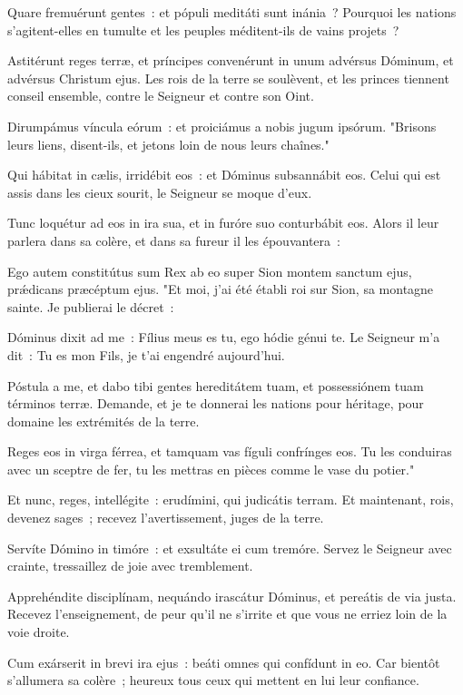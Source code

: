 \begin{paracol}{2}

\LigneParacol{0cm}
{Quare fremuérunt gentes~: \GreStar{} et pópuli meditáti sunt inánia~?}
{Pourquoi les nations s'agitent-elles en tumulte et les peuples méditent-ils de vains projets~? }

\LigneParacol{0.2cm}
{Astitérunt reges terræ, et príncipes convenérunt in unum \GreStar{} advérsus Dóminum, et advérsus Christum ejus.}
{Les rois de la terre se soulèvent, et les princes tiennent conseil ensemble, contre le Seigneur et contre son Oint. }

\LigneParacol{0.2cm}
{Dirumpámus víncula eórum~: \GreStar{} et proiciámus a nobis jugum ipsórum.}
{"Brisons leurs liens, disent-ils, et jetons loin de nous leurs chaînes." }

\LigneParacol{0.2cm}
{Qui hábitat in cælis, irridébit eos~: \GreStar{} et Dóminus subsannábit eos.}
{Celui qui est assis dans les cieux sourit, le Seigneur se moque d'eux. }

\LigneParacol{0.2cm}
{Tunc loquétur ad eos in ira sua, \GreStar{} et in furóre suo conturbábit eos.}
{Alors il leur parlera dans sa colère, et dans sa fureur il les épouvantera~: }

\LigneParacol{0.2cm}
{Ego autem constitútus sum Rex ab eo super Sion montem sanctum ejus, \GreStar{} prǽdicans præcéptum ejus.}
{"Et moi, j'ai été établi roi sur Sion, sa montagne sainte. Je publierai le décret~:}

\LigneParacol{0.2cm}
{Dóminus dixit ad me~: \GreStar{} Fílius meus es tu, ego hódie génui te.}
{Le Seigneur m'a dit~: Tu es mon Fils, je t'ai engendré aujourd'hui. }

\LigneParacol{0.2cm}
{Póstula a me, et dabo tibi gentes hereditátem tuam, \GreStar{} et possessiónem tuam términos terræ.}
{Demande, et je te donnerai les nations pour héritage, pour domaine les extrémités de la terre. }

\LigneParacol{0.2cm}
{Reges eos in virga férrea, \GreStar{} et tamquam vas fíguli confrínges eos.}
{Tu les conduiras avec un sceptre de fer, tu les mettras en pièces comme le vase du potier." }

\LigneParacol{0.2cm}
{Et nunc, reges, intellégite~: \GreStar{} erudímini, qui judicátis terram.}
{Et maintenant, rois, devenez sages~; recevez l'avertissement, juges de la terre. }

\LigneParacol{0.2cm}
{Servíte Dómino in timóre~: \GreStar{} et exsultáte ei cum tremóre.}
{Servez le Seigneur avec crainte, tressaillez de joie avec tremblement. }

\LigneParacol{0.2cm}
{Apprehéndite disciplínam, nequándo irascátur Dóminus, \GreStar{} et pereátis de via justa.}
{Recevez l'enseignement, de peur qu'il ne s'irrite et que vous ne erriez loin de la voie droite.}

\LigneParacol{0.2cm}
{Cum exárserit in brevi ira ejus~: \GreStar{} beáti omnes qui confídunt in eo.}
{Car bientôt s'allumera sa colère~; heureux tous ceux qui mettent en lui leur confiance. }

\end{paracol}
